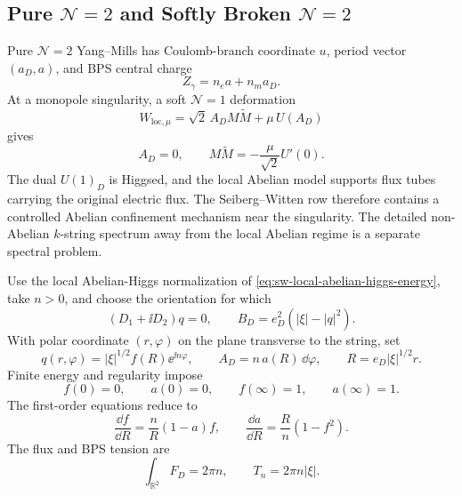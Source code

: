\subsection[Pure N=2 and Softly Broken N=2]{Pure \(\mathcal N=2\) and Softly Broken \(\mathcal N=2\)}

Pure \(\mathcal N=2\) Yang--Mills has Coulomb-branch coordinate \(u\), period
vector \((a_D,a)\), and BPS central charge
\[
  Z_\gamma=n_ea+n_ma_D .
\]
At a monopole singularity, a soft \(\mathcal N=1\) deformation
\[
  W_{\mathrm{loc},\mu}
  =
  \sqrt2\,A_DM\widetilde M+\mu\,U(A_D)
\]
gives
\[
  A_D=0,\qquad
  M\widetilde M=-\frac{\mu}{\sqrt2}U'(0).
\]
The dual \(U(1)_D\) is Higgsed, and the local Abelian model supports flux
tubes carrying the original electric flux.  The Seiberg--Witten row therefore
contains a controlled Abelian confinement mechanism near the singularity.
The detailed non-Abelian \(k\)-string spectrum away from the local Abelian
regime is a separate spectral problem.

\begin{controlledapproximation}
\label{ca:sw-radial-bps-string-profile}
Use the local Abelian-Higgs normalization of
\eqref{eq:sw-local-abelian-higgs-energy}, take \(n>0\), and choose the
orientation for which
\begin{equation}
  (D_1+\ii D_2)q=0,\qquad B_D=e_D^2(|\xi|-|q|^2).
  \label{eq:family-sw-bps-vortex-equations}
\end{equation}
With polar coordinate \((r,\varphi)\) on the plane transverse to the string,
set
\begin{equation}
  q(r,\varphi)=|\xi|^{1/2}f(R)\ee^{\ii n\varphi},
  \qquad
  A_D=n\,a(R)\,\dd\varphi,\qquad
  R=e_D|\xi|^{1/2}r .
  \label{eq:family-sw-vortex-ansatz}
\end{equation}
Finite energy and regularity impose
\begin{equation}
  f(0)=0,\qquad a(0)=0,\qquad
  f(\infty)=1,\qquad a(\infty)=1.
  \label{eq:family-sw-vortex-boundary-conditions}
\end{equation}
The first-order equations reduce to
\begin{equation}
  \frac{\dd f}{\dd R}=\frac{n}{R}(1-a)f,
  \qquad
  \frac{\dd a}{\dd R}=\frac{R}{n}(1-f^2).
  \label{eq:family-sw-vortex-radial-ode}
\end{equation}
The flux and BPS tension are
\begin{equation}
  \int_{\mathbb R^2}F_D=2\pi n,\qquad
  T_n=2\pi n|\xi|.
  \label{eq:family-sw-vortex-flux-tension}
\end{equation}
\end{controlledapproximation}

